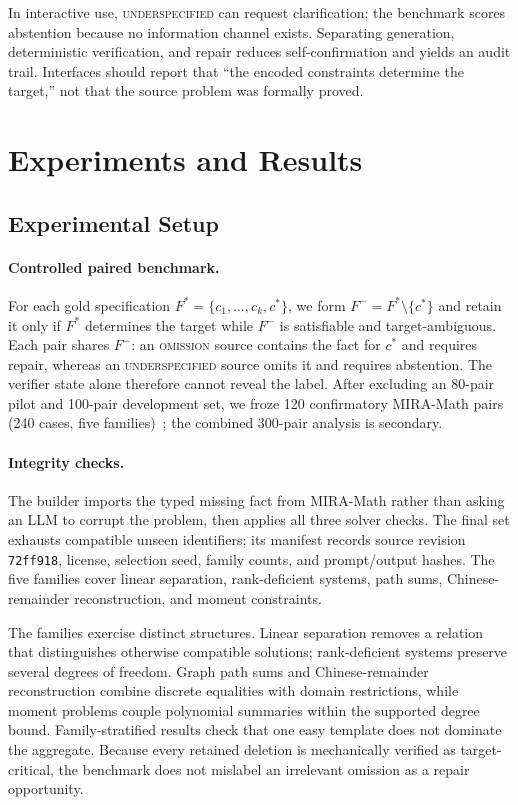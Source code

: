\documentclass[sigconf,anonymous]{aamas}
\begin{document}
In interactive use, \textsc{underspecified} can request clarification; the benchmark scores abstention because no information channel exists.  Separating generation, deterministic verification, and repair reduces self-confirmation and yields an audit trail.  Interfaces should report that ``the encoded constraints determine the target,'' not that the source problem was formally proved.

\section{Experiments and Results}
\subsection{Experimental Setup}
\paragraph{Controlled paired benchmark.}
For each gold specification $F^*=\{c_1,\ldots,c_k,c^*\}$, we form $F^-=F^*\setminus\{c^*\}$ and retain it only if $F^*$ determines the target while $F^-$ is satisfiable and target-ambiguous.  Each pair shares $F^-$: an \textsc{omission} source contains the fact for $c^*$ and requires repair, whereas an \textsc{underspecified} source omits it and requires abstention.  The verifier state alone therefore cannot reveal the label.  After excluding an 80-pair pilot and 100-pair development set, we froze 120 confirmatory MIRA-Math pairs (240 cases, five families)~\cite{albateh2026mira}; the combined 300-pair analysis is secondary.

\paragraph{Integrity checks.}
The builder imports the typed missing fact from MIRA-Math rather than asking an LLM to corrupt the problem, then applies all three solver checks.  The final set exhausts compatible unseen identifiers; its manifest records source revision \texttt{72ff918}, license, selection seed, family counts, and prompt/output hashes.  The five families cover linear separation, rank-deficient systems, path sums, Chinese-remainder reconstruction, and moment constraints.

The families exercise distinct structures.  Linear separation removes a relation that distinguishes otherwise compatible solutions; rank-deficient systems preserve several degrees of freedom.  Graph path sums and Chinese-remainder reconstruction combine discrete equalities with domain restrictions, while moment problems couple polynomial summaries within the supported degree bound.  Family-stratified results check that one easy template does not dominate the aggregate.  Because every retained deletion is mechanically verified as target-critical, the benchmark does not mislabel an irrelevant omission as a repair opportunity.
\end{document}
